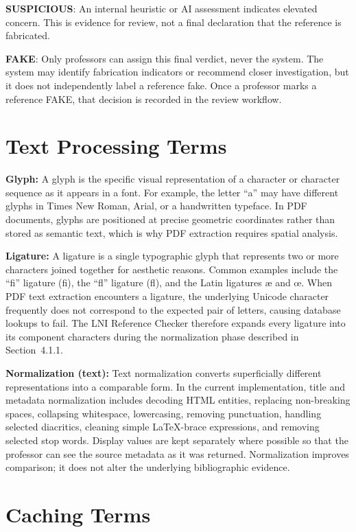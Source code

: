 \documentclass[12pt,a4paper,oneside]{report}
\begin{document}
\textbf{SUSPICIOUS}: An internal heuristic or AI assessment indicates elevated concern. This is evidence for review, not a final declaration that the reference is fabricated.

\textbf{FAKE}: Only professors can assign this final verdict, never the system. The system may identify fabrication indicators or recommend closer investigation, but it does not independently label a reference fake. Once a professor marks a reference FAKE, that decision is recorded in the review workflow.

\section{Text Processing Terms}

\textbf{Glyph:} A glyph is the specific visual representation of a 
character or character sequence as it appears in a font. For example, 
the letter ``a'' may have different glyphs in Times New Roman, Arial, 
or a handwritten typeface. In PDF documents, glyphs are positioned at 
precise geometric coordinates rather than stored as semantic text, 
which is why PDF extraction requires spatial analysis.

\textbf{Ligature:} A ligature is a single typographic glyph that 
represents two or more characters joined together for aesthetic 
reasons. Common examples include the ``fi'' ligature (ﬁ), the ``fl'' 
ligature (ﬂ), and the Latin ligatures \ae{} and \oe{}. When PDF text 
extraction encounters a ligature, the underlying Unicode character 
frequently does not correspond to the expected pair of letters, 
causing database lookups to fail. The LNI Reference Checker therefore 
expands every ligature into its component characters during the 
normalization phase described in Section~4.1.1.

\textbf{Normalization (text):} Text normalization converts superficially 
different representations into a comparable form. In the current 
implementation, title and metadata normalization includes decoding HTML 
entities, replacing non-breaking spaces, collapsing whitespace, lowercasing, 
removing punctuation, handling selected diacritics, cleaning simple 
LaTeX-brace expressions, and removing selected stop words. Display values 
are kept separately where possible so that the professor can see the source 
metadata as it was returned. Normalization improves comparison; it does not 
alter the underlying bibliographic evidence.

\section{Caching Terms}
\end{document}

